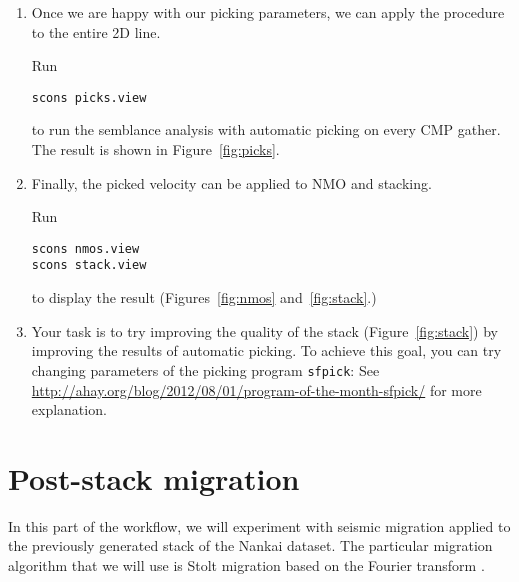 \begin{enumerate}

\item Once we are happy with our picking parameters, we can apply the procedure to the entire 2D line. 

Run
\begin{verbatim}
scons picks.view
\end{verbatim}
to run the semblance analysis with automatic picking on every CMP
gather. The result is shown in Figure~\ref{fig:picks}.


\item Finally, the picked velocity can be applied to NMO and stacking.         

Run
\begin{verbatim}
scons nmos.view
scons stack.view
\end{verbatim}
to display the result (Figures~\ref{fig:nmos} and~\ref{fig:stack}.) 



\item Your task is to try improving the quality of the stack (Figure~\ref{fig:stack}) by improving the results of automatic picking. To achieve this goal, you can try changing parameters of the picking program \texttt{sfpick}: See \url{http://ahay.org/blog/2012/08/01/program-of-the-month-sfpick/} for more explanation.

\end{enumerate}

\section{Post-stack migration}

In this part of the workflow, we will experiment with seismic migration applied to the previously generated stack of the Nankai dataset. The particular migration algorithm that we will use is Stolt migration based on the Fourier transform \cite[]{GEO50-11-22192244}.

